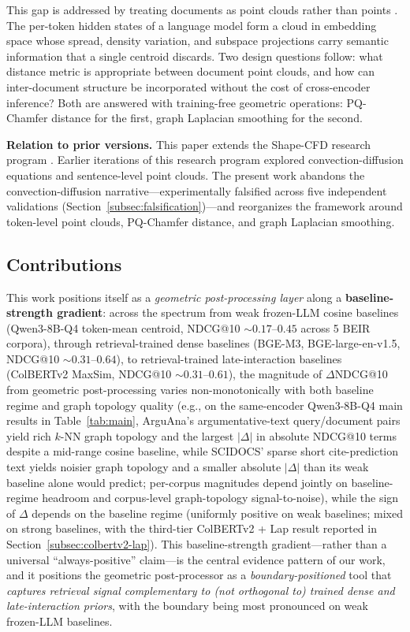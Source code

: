 \documentclass[review,1p]{elsarticle}
\begin{document}
This gap is addressed by treating documents as point clouds rather than points \citep{chen2026a}. The per-token hidden states of a language model form a cloud in embedding space whose spread, density variation, and subspace projections carry semantic information that a single centroid discards. Two design questions follow: what distance metric is appropriate between document point clouds, and how can inter-document structure be incorporated without the cost of cross-encoder inference? Both are answered with training-free geometric operations: PQ-Chamfer distance for the first, graph Laplacian smoothing for the second.

\textbf{Relation to prior versions.} This paper extends the Shape-CFD research program \citep{chen2026a,chen2026b}. Earlier iterations of this research program explored convection-diffusion equations and sentence-level point clouds. The present work abandons the convection-diffusion narrative---experimentally falsified across five independent validations (Section~\ref{subsec:falsification})---and reorganizes the framework around token-level point clouds, PQ-Chamfer distance, and graph Laplacian smoothing.

\subsection{Contributions}
\label{subsec:contributions}

This work positions itself as a \emph{geometric post-processing layer} along a \textbf{baseline-strength gradient}: across the spectrum from weak frozen-LLM cosine baselines (Qwen3-8B-Q4 token-mean centroid, NDCG@10 $\sim 0.17$--$0.45$ across 5 BEIR corpora), through retrieval-trained dense baselines (BGE-M3, BGE-large-en-v1.5, NDCG@10 $\sim 0.31$--$0.64$), to retrieval-trained late-interaction baselines (ColBERTv2 MaxSim, NDCG@10 $\sim 0.31$--$0.61$), the magnitude of $\Delta$NDCG@10 from geometric post-processing varies non-monotonically with both baseline regime and graph topology quality (e.g., on the same-encoder Qwen3-8B-Q4 main results in Table~\ref{tab:main}, ArguAna's argumentative-text query/document pairs yield rich $k$-NN graph topology and the largest $|\Delta|$ in absolute NDCG@10 terms despite a mid-range cosine baseline, while SCIDOCS' sparse short cite-prediction text yields noisier graph topology and a smaller absolute $|\Delta|$ than its weak baseline alone would predict; per-corpus magnitudes depend jointly on baseline-regime headroom and corpus-level graph-topology signal-to-noise), while the sign of $\Delta$ depends on the baseline regime (uniformly positive on weak baselines; mixed on strong baselines, with the third-tier ColBERTv2 + Lap result reported in Section~\ref{subsec:colbertv2-lap}). This baseline-strength gradient---rather than a universal ``always-positive'' claim---is the central evidence pattern of our work, and it positions the geometric post-processor as a \emph{boundary-positioned} tool that \emph{captures retrieval signal complementary to (not orthogonal to) trained dense and late-interaction priors}, with the boundary being most pronounced on weak frozen-LLM baselines.
\end{document}

